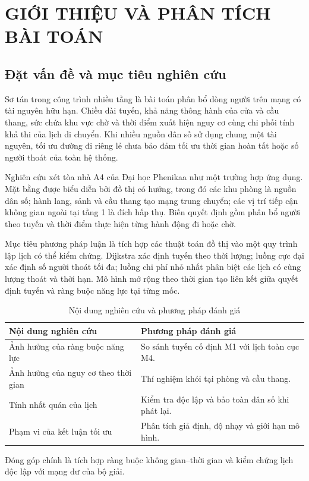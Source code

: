 \section{GIỚI THIỆU VÀ PHÂN TÍCH BÀI TOÁN}
\subsection{Đặt vấn đề và mục tiêu nghiên cứu}
Sơ tán trong công trình nhiều tầng là bài toán phân bổ dòng người trên mạng có tài nguyên hữu hạn. Chiều dài tuyến, khả năng thông hành của cửa và cầu thang, sức chứa khu vực chờ và thời điểm xuất hiện nguy cơ cùng chi phối tính khả thi của lịch di chuyển. Khi nhiều nguồn dân số sử dụng chung một tài nguyên, tối ưu đường đi riêng lẻ chưa bảo đảm tối ưu thời gian hoàn tất hoặc số người thoát của toàn hệ thống.

Nghiên cứu xét tòa nhà A4 của Đại học Phenikaa như một trường hợp ứng dụng. Mặt bằng được biểu diễn bởi đồ thị có hướng, trong đó các khu phòng là nguồn dân số; hành lang, sảnh và cầu thang tạo mạng trung chuyển; các vị trí tiếp cận không gian ngoài tại tầng 1 là đích hấp thụ. Biến quyết định gồm phân bổ người theo tuyến và thời điểm thực hiện từng hành động đi hoặc chờ.

Mục tiêu phương pháp luận là tích hợp các thuật toán đồ thị vào một quy trình lập lịch có thể kiểm chứng. Dijkstra xác định tuyến theo thời lượng; luồng cực đại xác định số người thoát tối đa; luồng chi phí nhỏ nhất phân biệt các lịch có cùng lượng thoát và thời hạn. Mô hình mở rộng theo thời gian tạo liên kết giữa quyết định tuyến và ràng buộc năng lực tại từng mốc.

\begin{table}[htbp]\centering\caption{Nội dung nghiên cứu và phương pháp đánh giá}
\small\begin{tabularx}{\linewidth}{P{5.3cm}X}\toprule
Nội dung nghiên cứu & Phương pháp đánh giá\\\midrule
Ảnh hưởng của ràng buộc năng lực & So sánh tuyến cố định M1 với lịch toàn cục M4.\\
Ảnh hưởng của nguy cơ theo thời gian & Thí nghiệm khói tại phòng và cầu thang.\\
Tính nhất quán của lịch & Kiểm tra độc lập và bảo toàn dân số khi phát lại.\\
Phạm vi của kết luận tối ưu & Phân tích giả định, độ nhạy và giới hạn mô hình.\\\bottomrule
\end{tabularx}\end{table}
Đóng góp chính là tích hợp ràng buộc không gian--thời gian và kiểm chứng lịch độc lập với mạng dư của bộ giải.

